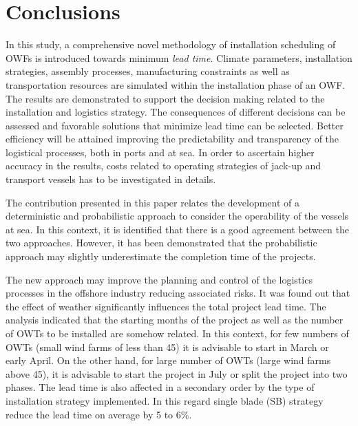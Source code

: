 \section{Conclusions}
\label{conclusions}


In this study, a comprehensive novel methodology of installation scheduling of OWFs is introduced towards minimum \textit{lead time}. Climate parameters, installation strategies, assembly processes, manufacturing constraints as well as transportation resources are simulated within the installation phase of an OWF. The results are demonstrated to support the decision making related to the installation and logistics strategy. The consequences of different decisions can be assessed and favorable solutions that minimize lead time can be selected. Better efficiency will be attained improving the predictability and transparency of the logistical processes, both in ports and at sea. In order to ascertain higher accuracy in the results, costs related to operating strategies of jack-up and transport vessels has to be investigated in details.

The contribution presented in this paper relates the development of a deterministic and probabilistic approach to consider the operability of the vessels at sea. In this context, it is identified that there is a good agreement between the two approaches. However, it has been demonstrated that the probabilistic approach may slightly underestimate the completion time of the projects.

The new approach may improve the planning and control of the logistics processes in the offshore industry reducing associated risks. It was found out that the effect of weather significantly influences the total project lead time. The analysis indicated that the starting months of the project as well as the number of OWTs to be installed are somehow related. In this context, for few numbers of OWTs (small wind farms of less than 45) it is advisable to start in March or early April. On the other hand, for large number of OWTs (large wind farms above 45), it is advisable to start the project in July or split the project into two phases. The lead time is also affected in a secondary order by the type of installation strategy implemented. In this regard single blade (SB) strategy reduce the lead time on average by 5 to 6\%.



